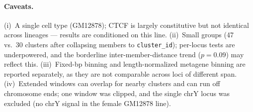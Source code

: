 \documentclass[11pt]{article}
\begin{document}
\paragraph{Caveats.} (i)~A single cell type (GM12878); CTCF is largely constitutive but not
identical across lineages --- results are conditioned on this line. (ii)~Small groups
(47 vs.\ 30 clusters after collapsing members to \texttt{cluster\_id}); per-locus tests are
underpowered, and the borderline inter-member-distance trend ($p=0.09$) may reflect this.
(iii)~Fixed-bp binning and length-normalized metagene binning are reported separately, as
they are not comparable across loci of different span. (iv)~Extended windows can overlap for
nearby clusters and can run off chromosome ends; one window was clipped, and the single chrY
locus was excluded (no chrY signal in the female GM12878 line).
\end{document}
